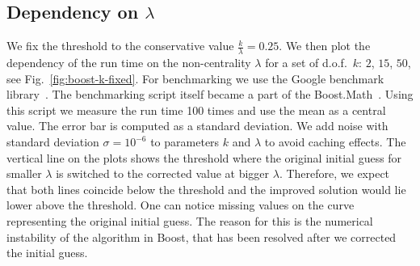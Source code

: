 \documentclass{amsart}
\numberwithin{equation}{section}
\begin{document}
\subsection{Dependency on $\lambda$} We fix the threshold to the conservative value  $\frac{k}{\lambda} = 0.25$. We then plot the dependency of the run time on the non-centrality $\lambda$ for a set of d.o.f.\ $k$: $2$, $15$, $50$, see Fig.~\ref{fig:boost-k-fixed}. For benchmarking we use the Google benchmark library~\cite{gbenchmark}. The benchmarking script itself became a part of the Boost.Math~\cite{gbench-script}. Using this script we measure the run time 100 times and use the mean as a central value. The error bar is computed as a standard deviation. We add noise with standard deviation $\sigma = 10^{-6}$ to parameters $k$ and $\lambda$ to avoid caching effects. The vertical line on the plots shows the threshold where the original initial guess for smaller $\lambda$ is switched to the corrected value at bigger $\lambda$. Therefore, we expect that both lines coincide below the threshold and the improved solution would lie lower above the threshold. One can notice missing values on the curve representing the original initial guess. The reason for this is the numerical instability of the algorithm in Boost, that has been resolved after we corrected the initial guess.
%
\end{document}
